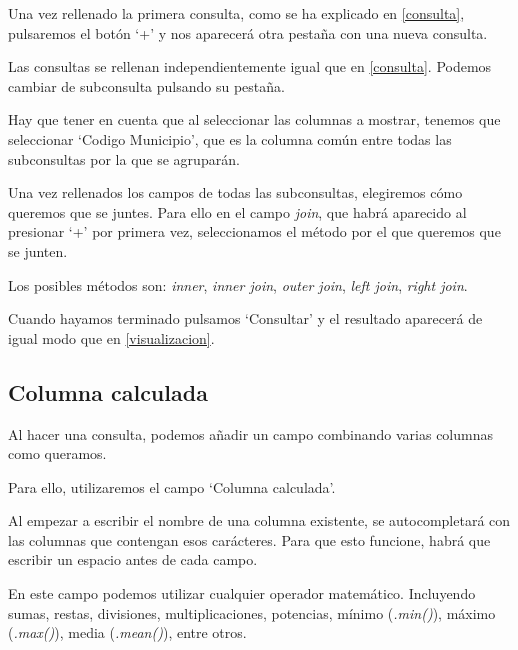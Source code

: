 Una vez rellenado la primera consulta, como se ha explicado en \ref{consulta}, pulsaremos el botón `+' y nos aparecerá otra pestaña con una nueva consulta.



Las consultas se rellenan independientemente igual que en \ref{consulta}. Podemos cambiar de subconsulta pulsando su pestaña.

Hay que tener en cuenta que al seleccionar las columnas a mostrar, tenemos que seleccionar `Codigo Municipio', que es la columna común entre todas las subconsultas por la que se agruparán.

Una vez rellenados los campos de todas las subconsultas, elegiremos cómo queremos que se juntes. Para ello en el campo \textit{join}, que habrá aparecido al presionar `+' por primera vez, seleccionamos el método por el que queremos que se junten.

Los posibles métodos son: \textit{inner}, \textit{inner join}, \textit{outer join}, \textit{left join}, \textit{right join}.


Cuando hayamos terminado pulsamos `Consultar' y el resultado aparecerá de igual modo que en \ref{visualizacion}.

\subsection{Columna calculada} \label{calculada}

Al hacer una consulta, podemos añadir un campo combinando varias columnas como queramos.

Para ello, utilizaremos el campo `Columna calculada'.

Al empezar a escribir el nombre de una columna existente, se autocompletará con las columnas que contengan esos carácteres. Para que esto funcione, habrá que escribir un espacio antes de cada campo.


En este campo podemos utilizar cualquier operador matemático. Incluyendo sumas, restas, divisiones, multiplicaciones, potencias, mínimo (\textit{.min()}), máximo (\textit{.max()}), media (\textit{.mean()}), entre otros.


